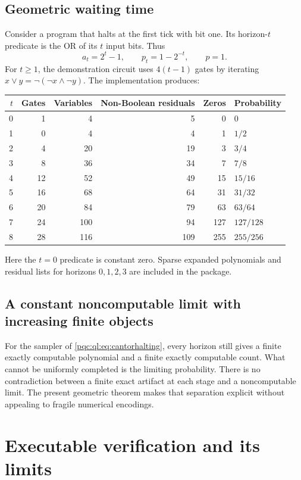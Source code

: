 \documentclass[11pt,letterpaper]{article}
\numberwithin{equation}{section}
\theoremstyle{definition}
\theoremstyle{remark}
\newcommand{\srcmark}[1]{\par\noindent{\small\itshape [source~#1]}\par}
\begin{document}
\subsection{Geometric waiting time}
Consider a program that halts at the first tick with bit one. Its
horizon-$t$ predicate is the OR of its $t$ input bits. Thus
\[
 a_t=2^t-1,\qquad p_t=1-2^{-t},\qquad p=1.
\]
For $t\ge1$, the demonstration circuit uses $4(t-1)$ gates by iterating
$x\lor y=\neg(\neg x\land\neg y)$. The implementation produces:
\begin{center}
\begin{tabular}{rrrrrl}
\toprule
$t$ & Gates & Variables & Non-Boolean residuals & Zeros & Probability\\
\midrule
0&1&4&5&0&$0$\\
1&0&4&4&1&$1/2$\\
2&4&20&19&3&$3/4$\\
3&8&36&34&7&$7/8$\\
4&12&52&49&15&$15/16$\\
5&16&68&64&31&$31/32$\\
6&20&84&79&63&$63/64$\\
7&24&100&94&127&$127/128$\\
8&28&116&109&255&$255/256$\\
\bottomrule
\end{tabular}
\end{center}
Here the $t=0$ predicate is constant zero. Sparse expanded polynomials and
residual lists for horizons $0,1,2,3$ are included in the package.

\subsection{A constant noncomputable limit with increasing finite objects}
For the sampler of \eqref{pqc:ql:eq:cantorhalting}, every horizon still gives a
finite exactly computable polynomial and a finite exactly computable
count. What cannot be uniformly completed is the limiting probability.
There is no contradiction between a finite exact artifact at each stage
and a noncomputable limit. The present geometric theorem makes that
separation explicit without appealing to fragile numerical encodings.

\section{Executable verification and its limits}\label{pqc:ql:sec:verification}
\srcmark{13}
\end{document}

